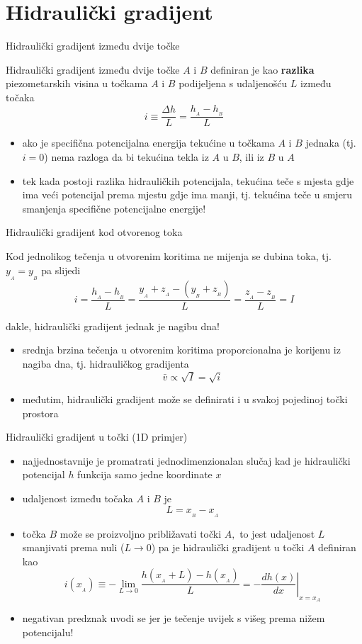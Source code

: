 \documentclass{beamer}
\begin{document}
\section{Hidraulički gradijent}
\begin{frame}{Hidraulički gradijent između dvije točke}
\begin{alertblock}{}
\alert{Hidraulički gradijent} između dvije točke $A$ i $B$ definiran
je kao \textbf{razlika} piezometarskih visina u točkama $A$ i $B$
podijeljena s udaljenošću $L$ između točaka 
\[
i\equiv\frac{\Delta h}{L}=\frac{h_{_{A}}-h_{_{B}}}{L}
\]
\end{alertblock}
\begin{itemize}
\item ako je specifična potencijalna energija tekućine u točkama $A$ i
$B$ jednaka (tj. $i=0$) nema razloga da bi tekućina tekla iz $A$
u $B$, ili iz $B$ u $A$ 
\item tek kada postoji razlika hidrauličkih potencijala, tekućina teče s
mjesta gdje ima veći potencijal prema mjestu gdje ima manji, tj. \alert{tekućina teče u smjeru smanjenja specifične potencijalne energije!} 
\end{itemize}
\end{frame}
%
\begin{frame}{Hidraulički gradijent kod otvorenog toka}
\begin{alertblock}{}
\alert{Kod jednolikog tečenja} u otvorenim koritima ne mijenja
se dubina toka, tj. $y_{_{A}}=y_{_{B}}$ pa slijedi 
\[
i=\frac{h_{_{A}}-h_{_{B}}}{L}=\frac{y_{_{A}}+z_{_{A}}-(y_{_{B}}+z_{_{B}})}{L}=\frac{z_{_{A}}-z_{_{B}}}{L}=I
\]

dakle, \alert{hidraulički gradijent jednak je nagibu dna!} 
\end{alertblock}
\begin{itemize}
\item srednja brzina tečenja u otvorenim koritima proporcionalna je korijenu
iz nagiba dna, tj. hidrauličkog gradijenta 
\[
\bar{v}\propto\sqrt{I}=\sqrt{i}
\]
\item međutim, hidraulički gradijent može se definirati i u svakoj pojedinoj
točki prostora 
\end{itemize}
\end{frame}
%
\begin{frame}{Hidraulički gradijent u točki (1D primjer)}
\begin{itemize}
\item najjednostavnije je promatrati jednodimenzionalan slučaj kad je hidraulički
potencijal $h$ funkcija samo jedne koordinate $x$ 
\item udaljenost između točaka $A$ i $B$ je 
\[
L=x_{_{B}}-x_{_{A}}
\]
\item točka $B$ može se proizvoljno približavati točki $A,$ to jest udaljenost
$L$ smanjivati prema nuli ($L\rightarrow0$) pa je hidraulički gradijent
u točki $A$ definiran kao 
\[
i(x_{_{A}})\equiv-\lim_{L\rightarrow0}\frac{h(x_{_{A}}+L)-h(x_{_{A}})}{L}=\left.-\frac{dh(x)}{dx}\right|_{x=x_{A}}
\]
\item negativan predznak uvodi se jer je tečenje uvijek s višeg prema nižem
potencijalu! 
\end{itemize}
\end{frame}
\end{document}

